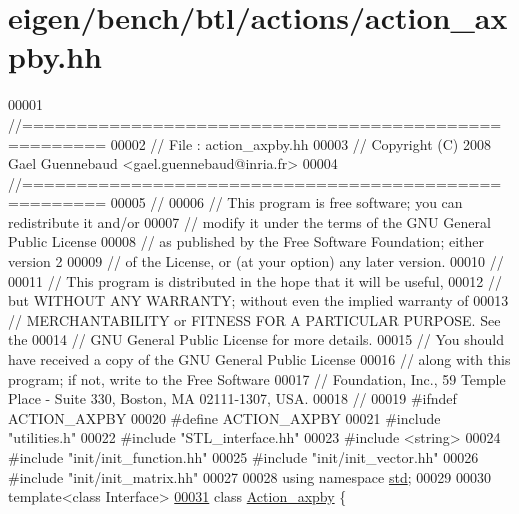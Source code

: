 \hypertarget{eigen_2bench_2btl_2actions_2action__axpby_8hh_source}{}\section{eigen/bench/btl/actions/action\+\_\+axpby.hh}
\label{eigen_2bench_2btl_2actions_2action__axpby_8hh_source}

\begin{DoxyCode}
00001 \textcolor{comment}{//=====================================================}
00002 \textcolor{comment}{// File   :  action\_axpby.hh}
00003 \textcolor{comment}{// Copyright (C) 2008 Gael Guennebaud <gael.guennebaud@inria.fr>}
00004 \textcolor{comment}{//=====================================================}
00005 \textcolor{comment}{//}
00006 \textcolor{comment}{// This program is free software; you can redistribute it and/or}
00007 \textcolor{comment}{// modify it under the terms of the GNU General Public License}
00008 \textcolor{comment}{// as published by the Free Software Foundation; either version 2}
00009 \textcolor{comment}{// of the License, or (at your option) any later version.}
00010 \textcolor{comment}{//}
00011 \textcolor{comment}{// This program is distributed in the hope that it will be useful,}
00012 \textcolor{comment}{// but WITHOUT ANY WARRANTY; without even the implied warranty of}
00013 \textcolor{comment}{// MERCHANTABILITY or FITNESS FOR A PARTICULAR PURPOSE.  See the}
00014 \textcolor{comment}{// GNU General Public License for more details.}
00015 \textcolor{comment}{// You should have received a copy of the GNU General Public License}
00016 \textcolor{comment}{// along with this program; if not, write to the Free Software}
00017 \textcolor{comment}{// Foundation, Inc., 59 Temple Place - Suite 330, Boston, MA  02111-1307, USA.}
00018 \textcolor{comment}{//}
00019 \textcolor{preprocessor}{#ifndef ACTION\_AXPBY}
00020 \textcolor{preprocessor}{#define ACTION\_AXPBY}
00021 \textcolor{preprocessor}{#include "utilities.h"}
00022 \textcolor{preprocessor}{#include "STL\_interface.hh"}
00023 \textcolor{preprocessor}{#include <string>}
00024 \textcolor{preprocessor}{#include "init/init\_function.hh"}
00025 \textcolor{preprocessor}{#include "init/init\_vector.hh"}
00026 \textcolor{preprocessor}{#include "init/init\_matrix.hh"}
00027 
00028 \textcolor{keyword}{using namespace }\hyperlink{namespacestd}{std};
00029 
00030 \textcolor{keyword}{template}<\textcolor{keyword}{class} Interface>
\hyperlink{class_action__axpby}{00031} \textcolor{keyword}{class }\hyperlink{class_action__axpby}{Action\_axpby} \{

\end{DoxyCode}
